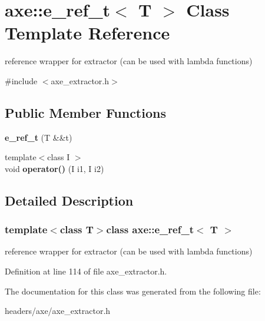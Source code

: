 \hypertarget{classaxe_1_1e__ref__t}{\section{axe\+:\+:e\+\_\+ref\+\_\+t$<$ T $>$ Class Template Reference}
\label{classaxe_1_1e__ref__t}
}


reference wrapper for extractor (can be used with lambda functions)  




{\ttfamily \#include $<$axe\+\_\+extractor.\+h$>$}

\subsection*{Public Member Functions}
\begin{DoxyCompactItemize}
\item 
\hypertarget{classaxe_1_1e__ref__t_a80a5c188221ccba575cb072ffbc1c570}{{\bfseries e\+\_\+ref\+\_\+t} (T \&\&t)}\label{classaxe_1_1e__ref__t_a80a5c188221ccba575cb072ffbc1c570}

\item 
\hypertarget{classaxe_1_1e__ref__t_afa80f260d5e9ec624e54e9abff95d82f}{{\footnotesize template$<$class I $>$ }\\void {\bfseries operator()} (I i1, I i2)}\label{classaxe_1_1e__ref__t_afa80f260d5e9ec624e54e9abff95d82f}

\end{DoxyCompactItemize}


\subsection{Detailed Description}
\subsubsection*{template$<$class T$>$class axe\+::e\+\_\+ref\+\_\+t$<$ T $>$}

reference wrapper for extractor (can be used with lambda functions) 

Definition at line 114 of file axe\+\_\+extractor.\+h.



The documentation for this class was generated from the following file\+:\begin{DoxyCompactItemize}
\item 
headers/axe/axe\+\_\+extractor.\+h\end{DoxyCompactItemize}
